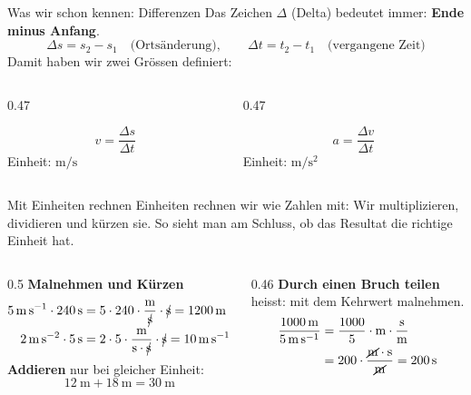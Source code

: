 \documentclass[14pt,aspectratio=169]{beamer}
\newcommand{\ein}[1]{\mathrm{#1}}
\newcommand{\kue}[1]{\cancel{\mathrm{#1}}}
\begin{document}
\begin{frame}{Was wir schon kennen: Differenzen}
  \small
  Das Zeichen $\Delta$ (Delta) bedeutet immer: \textbf{Ende minus Anfang}.
  \[
    \Delta s = s_2 - s_1 \quad\text{(Ortsänderung)}, \qquad
    \Delta t = t_2 - t_1 \quad\text{(vergangene Zeit)}
  \]
  Damit haben wir zwei Grössen definiert:
  \begin{columns}[T]
    \begin{column}{0.47\textwidth}
      \begin{merkbox}[Geschwindigkeit]
        \[
          v = \frac{\Delta s}{\Delta t}
        \]
        Einheit: $\si{\meter\per\second}$
      \end{merkbox}
    \end{column}
    \begin{column}{0.47\textwidth}
      \begin{merkbox}[Beschleunigung]
        \[
          a = \frac{\Delta v}{\Delta t}
        \]
        Einheit: $\si{\meter\per\second\squared}$
      \end{merkbox}
    \end{column}
  \end{columns}
\end{frame}

\begin{frame}{Mit Einheiten rechnen}
  \small
  Einheiten rechnen wir wie Zahlen mit: Wir multiplizieren, dividieren und
  kürzen sie. So sieht man am Schluss, ob das Resultat die richtige
  Einheit hat.
  \begin{columns}[T]
    \begin{column}{0.5\textwidth}
      \textbf{Malnehmen und Kürzen}
      \begin{align*}
        \SI{5}{\meter\per\second}\cdot\SI{240}{\second}
          &= 5\cdot240\cdot\frac{\ein{m}}{\kue{s}}\cdot\kue{s}
           = \SI{1200}{\meter}\\
        \SI{2}{\meter\per\second\squared}\cdot\SI{5}{\second}
          &= 2\cdot5\cdot\frac{\ein{m}}{\ein{s}\cdot\kue{s}}\cdot\kue{s}
           = \SI{10}{\meter\per\second}
      \end{align*}
      \textbf{Addieren} nur bei gleicher Einheit:
      \[
        \SI{12}{\meter}+\SI{18}{\meter}=\SI{30}{\meter}
      \]
    \end{column}
    \begin{column}{0.46\textwidth}
      \textbf{Durch einen Bruch teilen}\\
      heisst: mit dem Kehrwert malnehmen.
      \begin{align*}
        \frac{\SI{1000}{\meter}}{\SI{5}{\meter\per\second}}
          &= \frac{1000}{5}\cdot\ein{m}\cdot\frac{\ein{s}}{\ein{m}}\\
          &= 200\cdot\frac{\kue{m}\cdot\ein{s}}{\kue{m}}
           = \SI{200}{\second}
      \end{align*}
    \end{column}
  \end{columns}
\end{frame}
\end{document}
